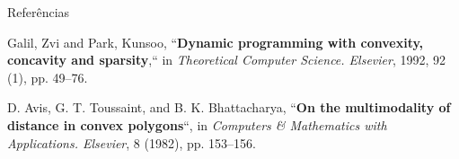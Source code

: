 \documentclass[final]{beamer}
\begin{document}
\begin{frame}[t]
\begin{columns}[t]
\begin{column}{0.60\paperwidth}
\begin{block}{Referências}
{\begin{thebibliography}{50}
        Galil, Zvi and Park, Kunsoo, ``\textbf{Dynamic programming with convexity, concavity and sparsity},`` in \textit{Theoretical Computer Science. Elsevier}, 1992, 92 (1), pp. 49--76.

        D. Avis, G. T. Toussaint, and B. K. Bhattacharya, ``\textbf{On the multimodality of distance in convex polygons}``, in \textit{Computers \& Mathematics with Applications. Elsevier}, 8 (1982), pp. 153--156.
        \end{thebibliography}}
    \end{block}


\end{column}

\end{columns}
\end{frame}
\end{document}
